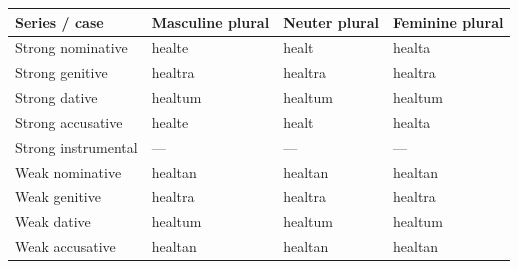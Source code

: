 \begin{tabular}{@{}>{\raggedright\arraybackslash}p{36.136mm}>{\raggedright\arraybackslash}p{28.98mm}>{\raggedright\arraybackslash}p{23.852mm}>{\raggedright\arraybackslash}p{26.595mm}@{}}
\toprule
\textbf{Series /\allowbreak{} case} & \textbf{Masculine plural} & \textbf{Neuter plural} & \textbf{Feminine plural} \\
\midrule
Strong nominative & healte & healt & healta \\
Strong genitive & healtra & healtra & healtra \\
Strong dative & healtum & healtum & healtum \\
Strong accusative & healte & healt & healta \\
Strong instrumental & — & — & — \\
Weak nominative & healtan & healtan & healtan \\
Weak genitive & healtra & healtra & healtra \\
Weak dative & healtum & healtum & healtum \\
Weak accusative & healtan & healtan & healtan \\
\bottomrule
\end{tabular}
\par\endgroup

